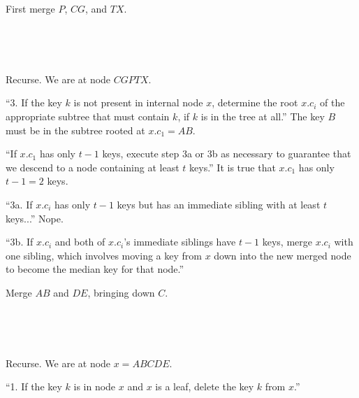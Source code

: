   First merge $P$, $CG$, and $TX$.  

\
	
\hfil{}

\

Recurse.  We are at node $CGPTX$.

``3.  If the key $k$ is not present in internal node $x$, determine the root $x.c_i$ of the appropriate subtree that must contain $k$, if $k$ is in the tree at all.''  The key $B$ must be in the subtree rooted at $x.c_1 = AB$.  

``If $x.c_1$ has only $t-1$ keys, execute step 3a or 3b as necessary to guarantee that we descend to a node containing at least $t$ keys.''  It is true that $x.c_1$ has only $t-1=2$ keys.  

``3a.  If $x.c_i$ has only $t-1$ keys but has an immediate sibling with at least $t$ keys...''  Nope.  

``3b.  If $x.c_i$ and both of $x.c_i$'s immediate siblings have $t-1$ keys, merge $x.c_i$ with one sibling, which involves moving a key from $x$ down into the new merged node to become the median key for that node.''

Merge $AB$ and $DE$, bringing down $C$.  

\

\hfil{}

\

Recurse.  We are at node $x=ABCDE$.  

``1.  If the key $k$ is in node $x$ and $x$ is a leaf, delete the key $k$ from $x$.''  

